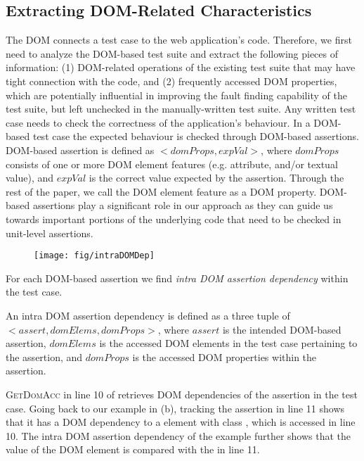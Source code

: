 \subsection{Extracting DOM-Related Characteristics} \label{Sec:extractDomRelatedInfo}
The DOM connects a test case to the web application's code. Therefore, we first need to analyze the DOM-based test suite and extract the following pieces of information: (1) DOM-related operations of the existing test suite that may have tight connection with the \javascript code, and (2) frequently accessed DOM properties, which are potentially influential in improving the fault finding capability of the test suite, but left unchecked in the manually-written test suite.
Any written test case needs to check the correctness of the application's behaviour. In a DOM-based test case the expected behaviour is checked through DOM-based assertions.
DOM-based assertion is defined as $<domProps,expVal>$, where $domProps$ consists of one or more DOM element features (e.g. attribute, and/or textual value), and $expVal$ is the correct value expected by the assertion. Through the rest of the paper, we call the DOM element feature as a DOM property. 
DOM-based assertions play a significant role in our approach as they can guide us towards important portions of the underlying \javascript code that need to be checked in unit-level assertions.
\begin{figure}[!t]
  \centering
  \texttt{[image: fig/intraDOMDep]}
   \vspace{-0.3in} 
  \label{Fig:assertionToCode}
  \vspace{-0.2in} 
\end{figure}
For each DOM-based assertion we find \emph{intra DOM assertion dependency} within the test case.
\begin{mydef}
\label{def:intraDOMDep}  
An intra DOM assertion dependency is defined as a three tuple of $<assert, domElems, domProps>$, where $assert$ is the intended DOM-based assertion, $domElems$ is the accessed DOM elements in the test case pertaining to the assertion, and $domProps$ is the accessed DOM properties within the assertion.
\end{mydef}
\textsc{GetDomAcc} in line 10 of  retrieves DOM dependencies of the assertion in the test case.
Going back to our example in (b), tracking the assertion in line 11 shows that it has a DOM dependency to a  element with class , which is accessed in line 10. The intra DOM assertion dependency of the example further shows that the  value of the DOM element is compared with the  in line 11.    

